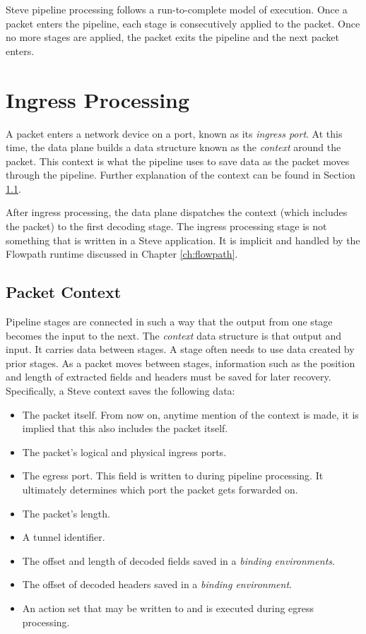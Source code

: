 Steve pipeline processing follows a run-to-complete model of execution. Once a
packet enters the pipeline, each stage is consecutively applied to
the packet. Once no more stages are applied, the packet exits the pipeline and
the next packet enters.


\section{Ingress Processing} \label{ingress_desc}

A packet enters a network device on a port, known as its \textit{ingress port}.
At this time, the data plane builds a data structure known as the
\textit{context} around the packet. This context is what the pipeline uses to
save data as the packet moves through the pipeline. Further explanation of the
context can be found in Section \ref{context_desc}.

After ingress processing, the data plane dispatches the context (which includes
the packet) to the first decoding stage. The ingress processing stage is not
something that is written in a Steve application. It is implicit and handled by
the Flowpath runtime discussed in Chapter \ref{ch:flowpath}.

\subsection{Packet Context} \label{context_desc}

Pipeline stages are connected in such a way that the output from one stage
becomes the input to the next. The \textit{context} data structure is that
output and input. It carries data between stages. A stage often needs to use
data created by prior stages. As a packet moves between stages, information such
as the position and length of extracted fields and headers must be saved for
later recovery. Specifically, a Steve context saves the following data:

\begin{itemize} \item The packet itself. From now on, anytime mention of the
context is made, it is implied that this also includes the packet itself. \item
The packet's logical and physical ingress ports. \item The egress port. This
field is written to during pipeline processing. It ultimately determines which
port the packet gets forwarded on. \item The packet's length. \item A tunnel
identifier. \item The offset and length of decoded fields saved in a
\textit{binding environments}. \item The offset of decoded headers saved in a
\textit{binding environment}. \item An action set that may be written to and is
executed during egress processing. \end{itemize}

